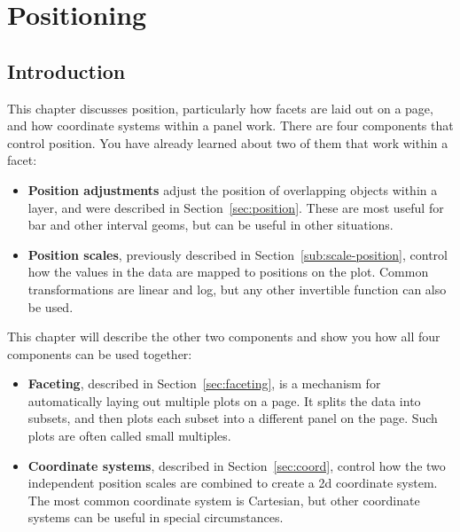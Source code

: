 
% 


\chapter{Positioning}
\label{cha:position}

\section{Introduction}

This chapter discusses position, particularly how facets are laid out on a page, and how coordinate systems within a panel work.  There are four components that control position.  You have already learned about two of them that work within a facet:

\begin{itemize}
  \item {\bf Position adjustments} adjust the position of overlapping objects within a layer, and were described in Section~\ref{sec:position}.  These are most useful for bar and other interval geoms, but can be useful in other situations.

  \item {\bf Position scales}, previously described in Section~\ref{sub:scale-position}, control how the values in the data are mapped to positions on the plot.  Common transformations are linear and log, but any other invertible function can also be used.
\end{itemize}

\noindent This chapter will describe the other two components and show you how all four components can be used together:

\begin{itemize}
  \item {\bf Faceting}, described in Section~\ref{sec:faceting}, is a mechanism for automatically laying out multiple plots on a page.  It splits the data into subsets, and then plots each subset into a different panel on the page.  Such plots are often called small multiples.  

  \item {\bf Coordinate systems}, described in Section~\ref{sec:coord}, control how the two independent position scales are combined to create a 2d coordinate system.  The most common coordinate system is Cartesian, but other coordinate systems can be useful in special circumstances.

\end{itemize}

